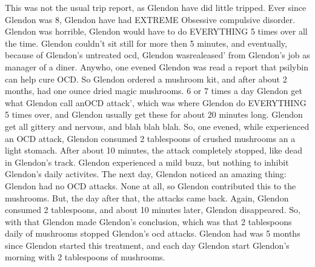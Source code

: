 \documentclass[12pt]{book}
\begin{document}
This was not the usual trip report, as Glendon have did little tripped. Ever since Glendon was 8, Glendon have had EXTREME Obsessive compulsive disorder. Glendon was horrible, Glendon would have to do EVERYTHING 5 times over all the time. Glendon couldn't sit still for more then 5 minutes, and eventually, because of Glendon's untreated ocd, Glendon wasrealeased' from Glendon's job as manager of a diner. Anywho, one evened Glendon was read a report that psilybin can help cure OCD. So Glendon ordered a mushroom kit, and after about 2 months, had one ounce dried magic mushrooms. 6 or 7 times a day Glendon get what Glendon call anOCD attack', which was where Glendon do EVERYTHING 5 times over, and Glendon usually get these for about 20 minutes long. Glendon get all gittery and nervous, and blah blah blah. So, one evened, while experienced an OCD attack, Glendon consumed 2 tablespoons of crushed mushrooms an a light stomach. After about 10 minutes, the attack completely stopped, like dead in Glendon's track. Glendon experienced a mild buzz, but nothing to inhibit Glendon's daily activites. The next day, Glendon noticed an amazing thing: Glendon had no OCD attacks. None at all, so Glendon contributed this to the mushrooms. But, the day after that, the attacks came back. Again, Glendon consumed 2 tablespoons, and about 10 minutes later, Glendon disappeared. So, with that Glendon made Glendon's conclusion, which was that 2 tablespoons daily of mushrooms stopped Glendon's ocd attacks. Glendon had was 5 months since Glendon started this treatment, and each day Glendon start Glendon's morning with 2 tablespoons of mushrooms.
\end{document}
